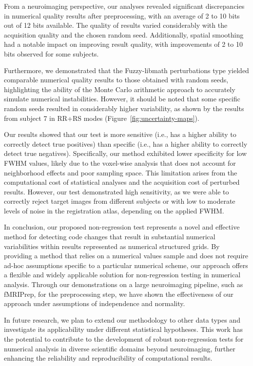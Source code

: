 \documentclass{article}
\newcommand{\fmriprep}{fMRIPrep\xspace}
\begin{document}
From a neuroimaging perspective, our analyses revealed significant discrepancies in numerical quality results after preprocessing, with an average of 2 to 10 bits out of 12 bits available. The quality of results varied considerably with the acquisition quality and the chosen random seed. Additionally, spatial smoothing had a notable impact on improving result quality, with improvements of 2 to 10 bits observed for some subjects.

Furthermore, we demonstrated that the Fuzzy-libmath perturbations type yielded comparable numerical quality results to those obtained with random seeds, highlighting the ability of the Monte Carlo arithmetic approach to accurately simulate numerical instabilities. However, it should be noted that some specific random seeds resulted in considerably higher variability, as shown by the results from subject 7 in RR+RS modes (Figure~\ref{fig:uncertainty-maps}).

Our results showed that our test is more sensitive (i.e., has a higher ability to correctly detect true positives) than specific (i.e., has a higher ability to correctly detect true negatives). Specifically, our method exhibited lower specificity for low FWHM values, likely due to the voxel-wise analysis that does not account for neighborhood effects and poor sampling space. This limitation arises from the computational cost of statistical analyses and the acquisition cost of perturbed results. However, our test demonstrated high sensitivity, as we were able to correctly reject target images from different subjects or with low to moderate levels of noise in the registration atlas, depending on the applied FWHM.

In conclusion, our proposed non-regression test represents a novel and effective method for detecting code changes that result in substantial numerical variabilities within results represented as numerical structured grids. By providing a method that relies on a numerical values sample and does not require ad-hoc assumptions specific to a particular numerical scheme, our approach offers a flexible and widely applicable solution for non-regression testing in numerical analysis.
Through our demonstrations on a large neuroimaging pipeline, such as \fmriprep, for the preprocessing step, we have shown the effectiveness of our approach under assumptions of independence and normality.

In future research, we plan to extend our methodology to other data types and investigate its applicability under different statistical hypotheses. This work has the potential to contribute to the development of robust non-regression tests for numerical analysis in diverse scientific domains beyond neuroimaging, further enhancing the reliability and reproducibility of computational results.
\end{document}
